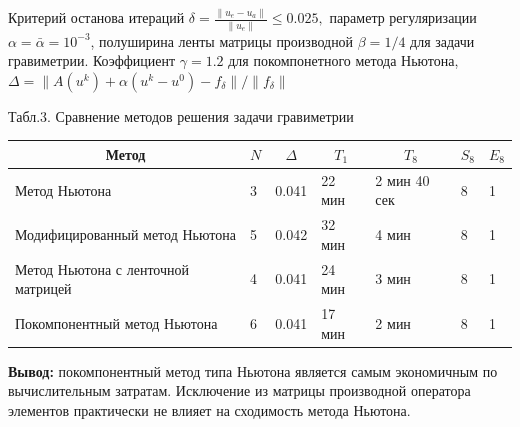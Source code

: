 \documentclass[10pt,pdf, mathserif, hyperref={unicode}]{beamer}
\begin{document}
\begin{frame}
	Критерий останова итераций 
	$\delta=\frac{\|u_e-u_a\|}{\|u_e\|}\leqslant 0.025,$ параметр регуляризации $\alpha=\bar{\alpha}=10^{-3}$, полуширина ленты матрицы производной $\beta=1/4$ для задачи гравиметрии. Коэффициент $\gamma=1.2$ для покомпонетного метода Ньютона, $\Delta=\|A(u^k)+\alpha(u^k-u^0)-f_\delta\|/\|f_\delta\|$
	
	\begin{table}[]
		\centering
		\renewcommand{\arraystretch}{1.5}
		\scriptsize{Табл.3. Сравнение методов решения задачи гравиметрии}
		\label{table3.1}
		\begin{tabular}{|p{}|p{}|l|l|l|l|l|}
			\hline
			\multicolumn{1}{|c|}{Метод}        & \multicolumn{1}{c|}{$N$} &
			\multicolumn{1}{c|}{$\Delta$} & \multicolumn{1}{c|}{$T_1$} & \multicolumn{1}{c|}{$T_8$} &
			\multicolumn{1}{c|}{$S_8$} & \multicolumn{1}{c|}{$E_8$}
			\\ \hline
			Метод Ньютона                      &  3        & 0.041                          &       22 мин                  &     2 мин 40 сек &
			8 & 1 \\ \hline
			Модифицированный метод Ньютона     &         5           & 0.042            & 32 мин                  & 4 мин      &
			8 & 1             \\ \hline
			Метод Ньютона с ленточной матрицей &  4               & 0.041                    & 24 мин                  & 3 мин       & 8 & 1            \\ \hline
			\rowcolor{Green}
			Покомпонентный метод Ньютона &  6               & 0.041                    & 17 мин                  & 2 мин       & 8 & 1            \\ \hline
		\end{tabular}
	\end{table}
	\textbf{\color{blue}Вывод:} покомпонентный метод типа Ньютона является самым экономичным по вычислительным затратам. Исключение из матрицы производной оператора элементов практически не влияет на сходимость метода Ньютона. 
\end{frame}
%	
\end{document}
